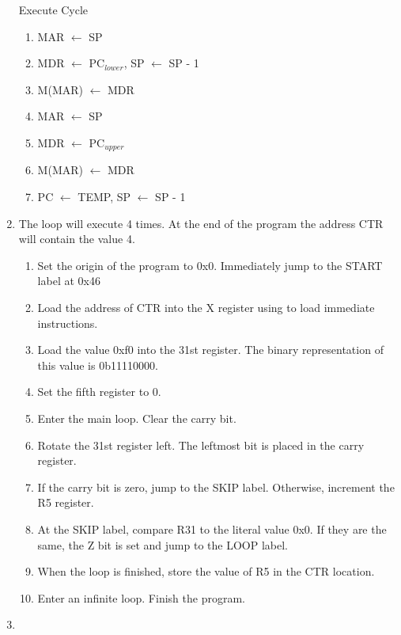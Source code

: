 \documentclass[12pt,letterpaper]{article}
\begin{document}
\begin{enumerate}
    Execute Cycle
    \begin{enumerate}[i]
        \item MAR $\leftarrow$ SP
        \item MDR $\leftarrow$ PC$_{lower}$, SP $\leftarrow$ SP - 1
        \item M(MAR) $\leftarrow$ MDR
        \item MAR $\leftarrow$ SP
        \item MDR $\leftarrow$ PC$_{upper}$
        \item M(MAR) $\leftarrow$ MDR
        \item PC $\leftarrow$ TEMP, SP $\leftarrow$ SP - 1
    \end{enumerate}
    \item The loop will execute 4 times. At the end of the program the address
    CTR will contain the value 4.

    \begin{enumerate}[i]
    \item Set the origin of the program to 0x0. Immediately jump to the START
    label at 0x46
    \item Load the address of CTR into the X register using to load immediate
    instructions.
    \item Load the value 0xf0 into the 31st register. The binary representation
    of this value is 0b11110000.
    \item Set the fifth register to 0.
    \item Enter the main loop. Clear the carry bit.
    \item Rotate the 31st register left. The leftmost bit is placed in the
    carry register.
    \item If the carry bit is zero, jump to the SKIP label. Otherwise,
    increment the R5 register.
    \item At the SKIP label, compare R31 to the literal value 0x0. If they are
    the same, the Z bit is set and jump to the LOOP label.
    \item When the loop is finished, store the value of R5 in the CTR location.
    \item Enter an infinite loop. Finish the program.

    \end{enumerate}

    \item 
\end{enumerate}
\end{document}

